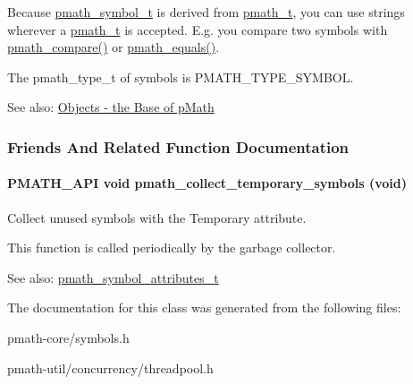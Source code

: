 Because \hyperlink{classpmath__symbol__t}{pmath\_\-symbol\_\-t} is derived from \hyperlink{classpmath__t}{pmath\_\-t}, you can use strings wherever a \hyperlink{classpmath__t}{pmath\_\-t} is accepted. E.g. you compare two symbols with \hyperlink{group__objects_gc57589e08f5b3eed28e724c646503735}{pmath\_\-compare()} or \hyperlink{group__objects_g6475af7f7c85777392e38c570ac07892}{pmath\_\-equals()}.

The pmath\_\-type\_\-t of symbols is PMATH\_\-TYPE\_\-SYMBOL.

\begin{Desc}
\item[See also:]\hyperlink{group__objects}{Objects - the Base of pMath} \end{Desc}


\subsubsection{Friends And Related Function Documentation}
\hypertarget{classpmath__symbol__t_8b277745c51f34c11ed78c10a2ecb44b}{
\paragraph[{pmath\_\-collect\_\-temporary\_\-symbols}]{\setlength{\rightskip}{0pt plus 5cm}PMATH\_\-API void pmath\_\-collect\_\-temporary\_\-symbols (void)}\hfill}
\label{classpmath__symbol__t_8b277745c51f34c11ed78c10a2ecb44b}


Collect unused symbols with the Temporary attribute. 

This function is called periodically by the garbage collector.

\begin{Desc}
\item[See also:]\hyperlink{group__symbols_g5d508ec0d32d617b6c642de54907ee17}{pmath\_\-symbol\_\-attributes\_\-t} \end{Desc}


The documentation for this class was generated from the following files:\begin{CompactItemize}
\item 
pmath-core/symbols.h\item 
pmath-util/concurrency/threadpool.h\end{CompactItemize}
